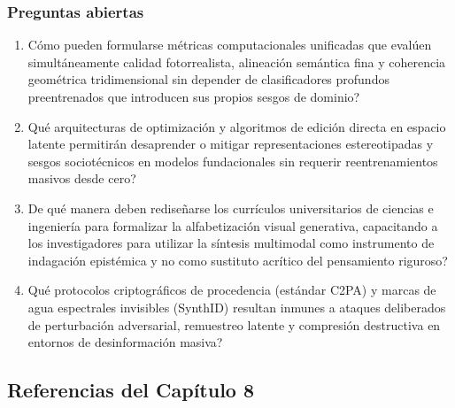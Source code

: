 \subsubsection*{Preguntas abiertas}
\begin{enumerate}[label=\arabic*., leftmargin=2em, itemsep=0.08cm, topsep=0.08cm, parsep=0pt]
    \item \textquestiondown Cómo pueden formularse métricas computacionales unificadas que evalúen simultáneamente calidad fotorrealista, alineación semántica fina y coherencia geométrica tridimensional sin depender de clasificadores profundos preentrenados que introducen sus propios sesgos de dominio?
    \item \textquestiondown Qué arquitecturas de optimización y algoritmos de edición directa en espacio latente permitirán desaprender o mitigar representaciones estereotipadas y sesgos sociotécnicos en modelos fundacionales sin requerir reentrenamientos masivos desde cero?
    \item \textquestiondown De qué manera deben rediseñarse los currículos universitarios de ciencias e ingeniería para formalizar la alfabetización visual generativa, capacitando a los investigadores para utilizar la síntesis multimodal como instrumento de indagación epistémica y no como sustituto acrítico del pensamiento riguroso?
    \item \textquestiondown Qué protocolos criptográficos de procedencia (estándar C2PA) y marcas de agua espectrales invisibles (SynthID) resultan inmunes a ataques deliberados de perturbación adversarial, remuestreo latente y compresión destructiva en entornos de desinformación masiva?
\end{enumerate}

\newpage
{}
\subsection*{Referencias del Capítulo 8}


